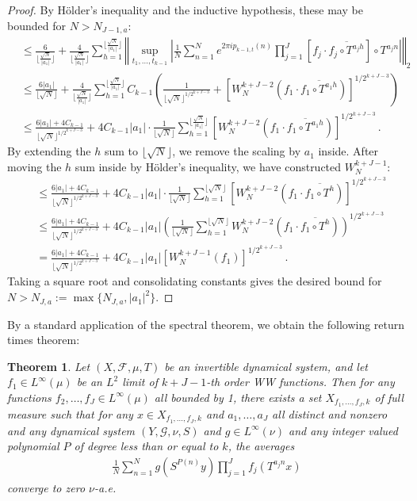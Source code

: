 \documentclass[11pt, oneside]{amsart}   	%
\newcommand{\1}{\mathbbm{1}}
\newcommand{\floor}[1]{\lfloor#1\rfloor}
\newtheorem{theorem}{Theorem}[section]
\theoremstyle{definition}
\begin{document}
\begin{proof}
By Hölder's inequality and the inductive hypothesis, these may be bounded for $N > N_{J-1, a}$:
\begin{align*}
&\leq \frac{6}{\floor{\frac{\sqrt{N}}{|a_1|}}} + \frac{4}{\floor{\frac{\sqrt{N}}{|a_1|}}}\sum_{h=1}^{\floor{\frac{\sqrt{N}}{|a_1|}}} \left\Vert \sup_{t_1, \dots, t_{k-1}} \left| \frac{1}{N}\sum_{n=1}^{N} e^{2\pi i p_{k-1, t}(n)} \prod_{j=1}^J [f_j \cdot \overline{f_j \circ T^{a_jh}}] \circ T^{a_jn} \right| \right\Vert_2 \\
&\leq \frac{6|a_1|}{\floor{\sqrt{N}}} + \frac{4}{\floor{\frac{\sqrt{N}}{|a_1|}}}\sum_{h=1}^{\floor{\frac{\sqrt{N}}{|a_1|}}} C_{k-1} \left( \frac{1}{\floor{\sqrt{N}}^{1/2^{k+J-3}}} + \left[W_{N}^{k+J-2}\left( f_1\cdot \overline{f_1 \circ T^{a_1h}} \right)\right]^{1/2^{k+J-3}} \right) \\
&\leq \frac{6|a_1|+4C_{k-1}}{\floor{\sqrt{N}}^{1/2^{k+J-3}}} + 4C_{k-1}|a_1| \cdot \frac{1}{\floor{\sqrt{N}}}\sum_{h=1}^{\floor{\frac{\sqrt{N}}{|a_1|}}} \left[W_{N}^{k+J-2}\left( f_1\cdot \overline{f_1 \circ T^{a_1h}} \right) \right]^{1/2^{k+J-3}} \, .
\end{align*}
By extending the $h$ sum to $\floor{\sqrt{N}}$, we remove the scaling by $a_1$ inside. After moving the $h$ sum inside by Hölder's inequality, we have constructed $W_N^{k+J-1}$:
\begin{align*}
&\leq \frac{6|a_1|+4C_{k-1}}{\floor{\sqrt{N}}^{1/2^{k+J-3}}} + 4C_{k-1}|a_1| \cdot \frac{1}{\floor{\sqrt{N}}}\sum_{h=1}^{\floor{\sqrt{N}}} \left[W_{N}^{k+J-2}\left( f_1\cdot \overline{f_1 \circ T^{h}} \right) \right]^{1/2^{k+J-3}} \\
&\leq \frac{6|a_1|+4C_{k-1}}{\floor{\sqrt{N}}^{1/2^{k+J-3}}} + 4C_{k-1}|a_1| \left( \frac{1}{\floor{\sqrt{N}}}\sum_{h=1}^{\floor{\sqrt{N}}} W_{N}^{k+J-2}\left( f_1\cdot \overline{f_1 \circ T^{h}} \right) \right)^{1/2^{k+J-3}} \\
&= \frac{6|a_1|+4C_{k-1}}{\floor{\sqrt{N}}^{1/2^{k+J-3}}} + 4C_{k-1}|a_1| \left[ W_{N}^{k+J-1}\left( f_1\right) \right]^{1/2^{k+J-3}} \, .
\end{align*}
Taking a square root and consolidating constants gives the desired bound for $N > N_{J, a} := \max\{N_{J, a}, |a_1|^2\}$.
\end{proof}
By a standard application of the spectral theorem, we obtain the following return times theorem:
\begin{theorem}\label{T:polynomial return times}
Let $(X, \mathcal{F}, \mu, T)$ be an invertible dynamical system, and let $f_1 \in L^\infty(\mu)$ be an $L^2$ limit of $k+J-1$-th order WW functions. Then for any functions $f_2, \dots, f_J\in L^\infty(\mu)$ all bounded by 1, there exists a set $X_{f_1, \dots, f_J, k}$ of full measure such that for any $x\in X_{f_1, \dots, f_J, k}$ and $a_1, \dots, a_J$ all distinct and nonzero and any dynamical system $(Y, \mathcal{G},\nu, S)$ and $g\in L^\infty(\nu)$ and any integer valued polynomial $P$ of degree less than or equal to $k$, the averages
\begin{align*}
\frac{1}{N}\sum_{n=1}^N g(S^{P(n)} y) \prod_{j=1}^J f_{j}(T^{a_j n} x)
\end{align*}
converge to zero $\nu$-a.e.
\end{theorem}
\end{document}
